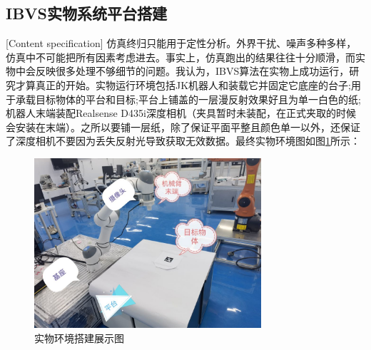 \documentclass[fontset=fandol,type=bachelor,campus=harbin,bsmainpagenumberline=true]{hithesisbook}
\begin{document}
\subsection{IBVS实物系统平台搭建}[Content specification]
仿真终归只能用于定性分析。外界干扰、噪声多种多样，仿真中不可能把所有因素考虑进去。事实上，仿真跑出的结果往往十分顺滑，而实物中会反映很多处理不够细节的问题。我认为，IBVS算法在实物上成功运行，研究才算真正的开始。实物运行环境包括JK机器人和装载它并固定它底座的台子;用于承载目标物体的平台和目标;平台上铺盖的一层漫反射效果好且为单一白色的纸;机器人末端装配Realsense D435i深度相机（夹具暂时未装配，在正式夹取的时候会安装在末端）。之所以要铺一层纸，除了保证平面平整且颜色单一以外，还保证了深度相机不要因为丢失反射光导致获取无效数据。最终实物环境图如图\ref{实物环境搭建展示图}所示：
\begin{figure}[h]
\centering
\includegraphics[width = 0.75\textwidth]{chapter2/实物环境搭建展示图}
\caption{实物环境搭建展示图}
\label{实物环境搭建展示图}
\end{figure}
\end{document}
